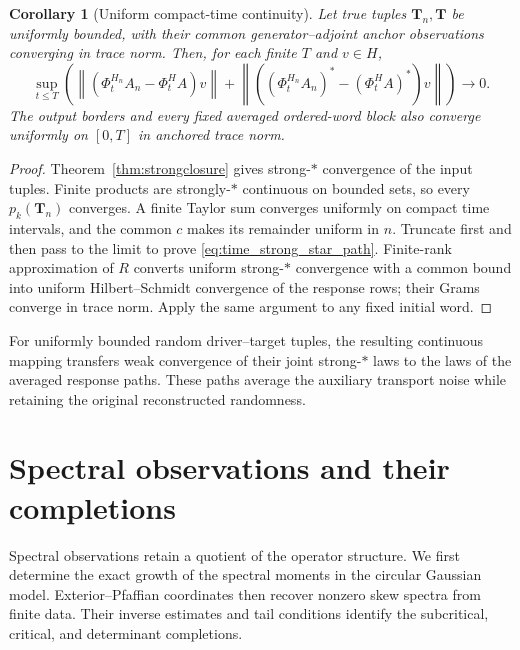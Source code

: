 \documentclass[11pt,a4paper]{amsart}
\numberwithin{equation}{section}
\newtheorem{corollary}[theorem]{Corollary}
\theoremstyle{definition}
\theoremstyle{remark}
\newcommand{\norm}[1]{\left\lVert#1\right\rVert}
\begin{document}
\begin{corollary}[Uniform compact-time continuity]\label{cor:time_true_continuity}
Let true tuples $\mathbf T_n,\mathbf T$ be uniformly bounded, with their common generator--adjoint anchor observations converging in trace norm. Then, for each finite $T$ and $v\in H$,
\begin{equation}\label{eq:time_strong_star_path}
 \sup_{t\le T}\left(\norm{(\Phi_t^{H_n}A_n-\Phi_t^HA)v}
 +\norm{((\Phi_t^{H_n}A_n)^*-(\Phi_t^HA)^*)v}\right)\longrightarrow0.
\end{equation}
The output borders and every fixed averaged ordered-word block also converge uniformly on $[0,T]$ in anchored trace norm.
\end{corollary}
\begin{proof}
Theorem~\ref{thm:strongclosure} gives strong-$*$ convergence of the input tuples. Finite products are strongly-$*$ continuous on bounded sets, so every $p_k(\mathbf T_n)$ converges. A finite Taylor sum converges uniformly on compact time intervals, and the common $c$ makes its remainder uniform in $n$. Truncate first and then pass to the limit to prove \eqref{eq:time_strong_star_path}. Finite-rank approximation of $R$ converts uniform strong-$*$ convergence with a common bound into uniform Hilbert--Schmidt convergence of the response rows; their Grams converge in trace norm. Apply the same argument to any fixed initial word.
\end{proof}
For uniformly bounded random driver--target tuples, the resulting continuous mapping transfers weak convergence of their joint strong-$*$ laws to the laws of the averaged response paths. These paths average the auxiliary transport noise while retaining the original reconstructed randomness.


\section{Spectral observations and their completions}\label{sec:spectralgrowth}\label{sec:pfaffian}
Spectral observations retain a quotient of the operator structure. We first determine the exact growth of the spectral moments in the circular Gaussian model. Exterior--Pfaffian coordinates then recover nonzero skew spectra from finite data. Their inverse estimates and tail conditions identify the subcritical, critical, and determinant completions.
\end{document}
